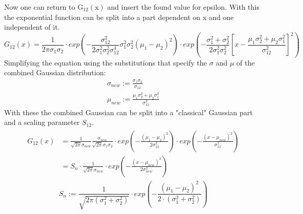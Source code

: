 \documentclass[twoside,openright]{scrreprt}
\begin{document}
Now one can return to $\mathrm{G_{12}(x)}$ and insert the found value for epsilon. With this the exponential function can be split into a part dependent on x and one independent of it.
\begin{equation*}
G_{12}(x) = \frac{1}{2\pi\sigma_1\sigma_2}\cdot exp\left(- \frac{\sigma_{12}^2}{2\sigma_1^2\sigma_2^2\sigma_{12}^4}\sigma_1^2\sigma_2^2\left(\mu_1-\mu_2\right)^2
\right) \cdot
exp\left(-\frac{\sigma_1^2+\sigma_2^2}{2\sigma_1^2\sigma_2^2} \left[x - \frac{\mu_1\sigma_2^2+\mu_2\sigma_1^2}{\sigma_{12}^2}\right]^2 \right)
\end{equation*}
Simplifying the equation using the substitutions that specify the $\sigma$ and $\mu$ of the combined Gaussian distribution:
\begin{gather*}
\sigma_{new} := \frac{\sigma_1\sigma_2}{\sigma_{12}}\\
\mu_{new} := \frac{\mu_1\sigma_2^2+ \mu_2\sigma_1^2}{\sigma_{12}^2}
\end{gather*}
With these the combined Gaussian can be split into a "classical" Gaussian part and a scaling parameter $S_{12}$.
\begin{gather*}
\begin{split}
G_{12}(x) & = \frac{1}{\sqrt{2\pi}\sigma_{new}}\frac{\sigma_{new}}{\sqrt{2\pi}\sigma_1\sigma_2}\cdot exp\left(- \frac{\left(\mu_1-\mu_2\right)^2}{2\sigma_{12}^2}\right) \cdot
exp\left(-\frac{\left(x-\mu_{new}\right)^2}{\sigma_{12}^2}\right)\\
& = S_n \cdot \frac{1}{\sqrt{2\pi}\sigma_{new}} \cdot exp\left(-\frac{\left(x-\mu_{new}\right)^2}{2\sigma_{new}^2}\right)
\end{split}
\end{gather*}
\begin{equation*}
S_{n} := \dfrac{1}{\sqrt{2\pi\left(\sigma_1^2+\sigma_2^2\right)}}\cdot exp\left(-\dfrac{\left(\mu_1 - \mu_2\right)^2}{2\cdot \left(\sigma_1^2+\sigma_2^2\right)}\right)
\end{equation*}
\end{document}
